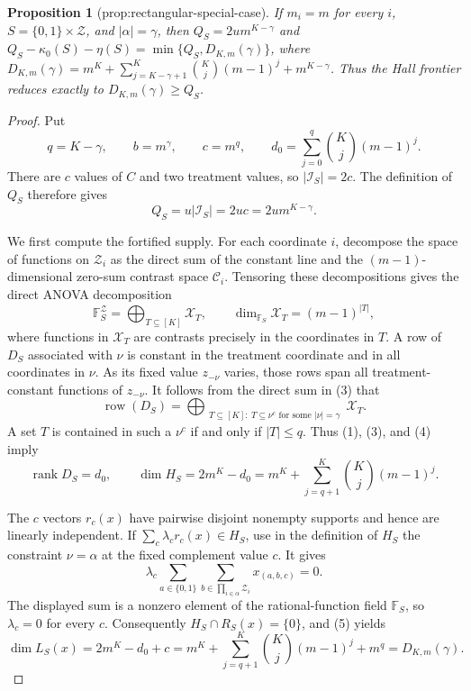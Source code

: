 \documentclass{article}
\newtheorem{proposition}{Proposition}
\begin{document}
\begin{proposition}[prop:rectangular-special-case]\label{prop:rectangular-special-case}
If \(m_i=m\) for every \(i\), \(S=\{0,1\}\times\mathcal Z\), and \(|\alpha|=\gamma\), then \(Q_S=2u m^{K-\gamma}\) and \(Q_S-\kappa_0(S)-\eta(S)=\min\{Q_S,D_{K,m}(\gamma)\}\), where \(D_{K,m}(\gamma)=m^K+\sum_{j=K-\gamma+1}^K\binom Kj(m-1)^j+m^{K-\gamma}\). Thus the Hall frontier reduces exactly to \(D_{K,m}(\gamma)\ge Q_S\).
\end{proposition}
\begin{proof}
Put
\[
q=K-\gamma,\qquad b=m^\gamma,\qquad c=m^q,
\qquad
d_0=\sum_{j=0}^{q}\binom Kj(m-1)^j.
\tag{1}
\]
There are \(c\) values of \(C\) and two treatment values, so
\(\lvert\mathcal I_S\rvert=2c\).  The definition of \(Q_S\) therefore gives
\[
Q_S=u\lvert\mathcal I_S\rvert=2uc=2u m^{K-\gamma}.
\tag{2}
\]

We first compute the fortified supply.  For each coordinate \(i\), decompose the
space of functions on \(\mathcal Z_i\) as the direct sum of the constant line and
the \((m-1)\)-dimensional zero-sum contrast space \(\mathscr C_i\).  Tensoring
these decompositions gives the direct ANOVA decomposition
\[
\mathbb F_S^{\mathcal Z}
=\bigoplus_{T\subseteq[K]}\mathscr X_T,
\qquad
\dim_{\mathbb F_S}\mathscr X_T=(m-1)^{\lvert T\rvert},
\tag{3}
\]
where functions in \(\mathscr X_T\) are contrasts precisely in the coordinates
in \(T\).  A row of \(D_S\) associated with \(\nu\) is constant in the treatment
coordinate and in all coordinates in \(\nu\).  As its fixed value
\(z_{-\nu}\) varies, those rows span all treatment-constant functions of
\(z_{-\nu}\).  It follows from the direct sum in (3) that
\[
\operatorname{row}(D_S)
=\bigoplus_{\substack{T\subseteq[K]:\ T\subseteq\nu^c
\text{ for some }\lvert\nu\rvert=\gamma}}
\mathscr X_T.
\tag{4}
\]
A set \(T\) is contained in such a \(\nu^c\) if and only if
\(\lvert T\rvert\le q\).  Thus (1), (3), and (4) imply
\[
\operatorname{rank}D_S=d_0,
\qquad
\dim H_S=2m^K-d_0
=m^K+\sum_{j=q+1}^{K}\binom Kj(m-1)^j.
\tag{5}
\]

The \(c\) vectors \(r_c(x)\) have pairwise disjoint nonempty supports and hence
are linearly independent.  If
\(\sum_c\lambda_c r_c(x)\in H_S\), use in the definition of \(H_S\) the
constraint \(\nu=\alpha\) at the fixed complement value \(c\).  It gives
\[
\lambda_c\sum_{a\in\{0,1\}}\sum_{b\in\prod_{i\in\alpha}\mathcal Z_i}
x_{(a,b,c)}=0.
\tag{6}
\]
The displayed sum is a nonzero element of the rational-function field
\(\mathbb F_S\), so \(\lambda_c=0\) for every \(c\).  Consequently
\(H_S\cap R_S(x)=\{0\}\), and (5) yields
\[
\dim L_S(x)=2m^K-d_0+c
=m^K+\sum_{j=q+1}^{K}\binom Kj(m-1)^j+m^q
=D_{K,m}(\gamma).
\tag{7}
\]


\end{proof}
\end{document}
